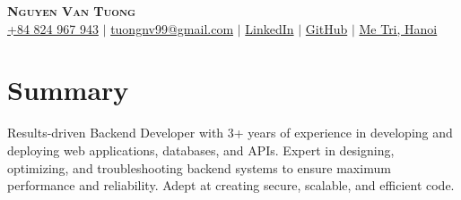 \documentclass[letterpaper,11pt]{article}
\newcommand{\resumeSubHeadingListStart}{\begin{itemize}[leftmargin=0.15in, label={}]}
\newcommand{\resumeSubHeadingListEnd}{\end{itemize}}
\begin{document}

\begin{center}
    \textbf{\Huge \scshape Nguyen Van Tuong} \\ \vspace{10pt}
    \small
    \faMobile \hspace{.5pt} \href{tel:84824967943}{+84 824 967 943}
    $|$
    \faAt \hspace{.5pt} \href{mailto:tuongnv99@gmail.com}{tuongnv99@gmail.com}
    $|$
    \faLinkedinSquare \hspace{.5pt} \href{https://www.linkedin.com/in/tuongnv}{LinkedIn}
    $|$
    \faGithub \hspace{.5pt} \href{https://github.com/tuongnv99}{GitHub}
    $|$
    \faMapMarker \hspace{.5pt} \href{https://maps.app.goo.gl/7cBHvJBrCku3NF1v7}{Me Tri, Hanoi}
\end{center}



\section{Summary}
  \vspace{2pt}
  \resumeSubHeadingListStart
    \small{\item{
        \hspace{10pt}
        { Results-driven Backend Developer with 3+ years of experience in developing and deploying web applications, databases, and APIs. Expert in designing, optimizing, and troubleshooting backend systems to ensure maximum performance and reliability. Adept at creating secure, scalable, and efficient code.}
    }}
  \resumeSubHeadingListEnd



\end{document}
